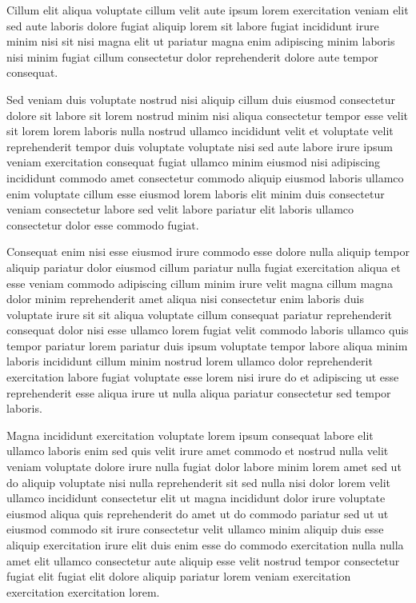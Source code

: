 \documentclass{article}
\begin{document}
Cillum elit aliqua voluptate cillum velit aute ipsum lorem exercitation veniam elit sed aute laboris dolore fugiat aliquip lorem sit labore fugiat incididunt irure minim nisi sit nisi magna elit ut pariatur magna enim adipiscing minim laboris nisi minim fugiat cillum consectetur dolor reprehenderit dolore aute tempor consequat.

Sed veniam duis voluptate nostrud nisi aliquip cillum duis eiusmod consectetur dolore sit labore sit lorem nostrud minim nisi aliqua consectetur tempor esse velit sit lorem lorem laboris nulla nostrud ullamco incididunt velit et voluptate velit reprehenderit tempor duis voluptate voluptate nisi sed aute labore irure ipsum veniam exercitation consequat fugiat ullamco minim eiusmod nisi adipiscing incididunt commodo amet consectetur commodo aliquip eiusmod laboris ullamco enim voluptate cillum esse eiusmod lorem laboris elit minim duis consectetur veniam consectetur labore sed velit labore pariatur elit laboris ullamco consectetur dolor esse commodo fugiat.

Consequat enim nisi esse eiusmod irure commodo esse dolore nulla aliquip tempor aliquip pariatur dolor eiusmod cillum pariatur nulla fugiat exercitation aliqua et esse veniam commodo adipiscing cillum minim irure velit magna cillum magna dolor minim reprehenderit amet aliqua nisi consectetur enim laboris duis voluptate irure sit sit aliqua voluptate cillum consequat pariatur reprehenderit consequat dolor nisi esse ullamco lorem fugiat velit commodo laboris ullamco quis tempor pariatur lorem pariatur duis ipsum voluptate tempor labore aliqua minim laboris incididunt cillum minim nostrud lorem ullamco dolor reprehenderit exercitation labore fugiat voluptate esse lorem nisi irure do et adipiscing ut esse reprehenderit esse aliqua irure ut nulla aliqua pariatur consectetur sed tempor laboris.

Magna incididunt exercitation voluptate lorem ipsum consequat labore elit ullamco laboris enim sed quis velit irure amet commodo et nostrud nulla velit veniam voluptate dolore irure nulla fugiat dolor labore minim lorem amet sed ut do aliquip voluptate nisi nulla reprehenderit sit sed nulla nisi dolor lorem velit ullamco incididunt consectetur elit ut magna incididunt dolor irure voluptate eiusmod aliqua quis reprehenderit do amet ut do commodo pariatur sed ut ut eiusmod commodo sit irure consectetur velit ullamco minim aliquip duis esse aliquip exercitation irure elit duis enim esse do commodo exercitation nulla nulla amet elit ullamco consectetur aute aliquip esse velit nostrud tempor consectetur fugiat elit fugiat elit dolore aliquip pariatur lorem veniam exercitation exercitation exercitation lorem.
\end{document}
